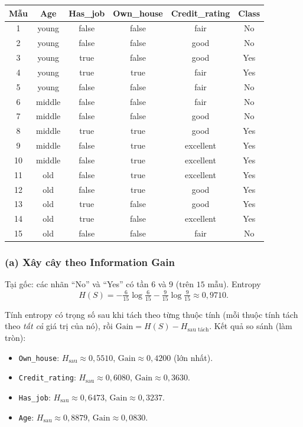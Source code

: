 \begin{center}
{\footnotesize
\begin{tabular}{@{}cccccc@{}}\toprule
Mẫu & Age & Has\_job & Own\_house & Credit\_rating & Class\\\midrule
1 & young & false & false & fair & No\\
2 & young & false & false & good & No\\
3 & young & true & false & good & Yes\\
4 & young & true & true & fair & Yes\\
5 & young & false & false & fair & No\\
6 & middle & false & false & fair & No\\
7 & middle & false & false & good & No\\
8 & middle & true & true & good & Yes\\
9 & middle & false & true & excellent & Yes\\
10 & middle & false & true & excellent & Yes\\
11 & old & false & true & excellent & Yes\\
12 & old & false & true & good & Yes\\
13 & old & true & false & good & Yes\\
14 & old & true & false & excellent & Yes\\
15 & old & false & false & fair & No\\
\bottomrule
\end{tabular}
}
\end{center}

\subsubsection*{(a) Xây cây theo Information Gain}

Tại gốc: các nhãn ``No'' và ``Yes'' có tần \(6\) và \(9\) (trên \(15\) mẫu). Entropy
\[
H(S)=-\tfrac{6}{15}\log\tfrac{6}{15}-\tfrac{9}{15}\log\tfrac{9}{15}\approx 0{,}9710.
\]

Tính entropy có trọng số sau khi tách theo từng thuộc tính (mỗi thuộc tính tách theo \emph{tất cả} giá trị của nó), rồi \(\text{Gain}=H(S)-H_{\text{sau tách}}\). Kết quả so sánh (làm tròn):
\begin{itemize}\setlength\itemsep{0pt}
  \item \texttt{Own\_house}: \(H_{\text{sau}}\approx 0{,}5510\), \(\text{Gain}\approx 0{,}4200\) (lớn nhất).
  \item \texttt{Credit\_rating}: \(H_{\text{sau}}\approx 0{,}6080\), \(\text{Gain}\approx 0{,}3630\).
  \item \texttt{Has\_job}: \(H_{\text{sau}}\approx 0{,}6473\), \(\text{Gain}\approx 0{,}3237\).
  \item \texttt{Age}: \(H_{\text{sau}}\approx 0{,}8879\), \(\text{Gain}\approx 0{,}0830\).
\end{itemize}

